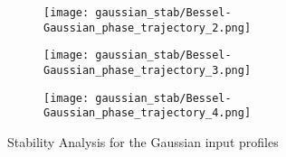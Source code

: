 \begin{figure}[H]
        \begin{subfigure}[b]{0.31\textwidth}
            \centering
            \texttt{[image: gaussian\_stab/Bessel-Gaussian\_phase\_trajectory\_2.png]}
            \label{fig:gaussian_stability7}
            \caption{}
        \end{subfigure}
        \begin{subfigure}[b]{0.31\textwidth}
            \centering
            \texttt{[image: gaussian\_stab/Bessel-Gaussian\_phase\_trajectory\_3.png]}
            \label{fig:gaussian_stability8}
            \caption{}
        \end{subfigure}
        \begin{subfigure}[b]{0.31\textwidth}
            \centering
            \texttt{[image: gaussian\_stab/Bessel-Gaussian\_phase\_trajectory\_4.png]}
            \label{fig:gaussian_stability9}
            \caption{}
        \end{subfigure}
        
        \caption{Stability Analysis for the Gaussian input profiles}
        \label{fig:Stability analysis for gaussian profiles}
\end{figure}

